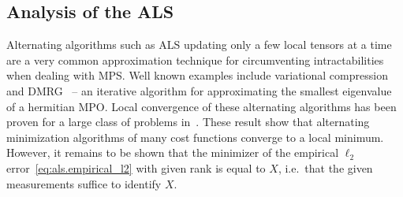 \subsection{Analysis of the ALS}%
\label{sub:als.ana}

Alternating algorithms such as ALS updating only a few local tensors at a time are a very common approximation technique for circumventing intractabilities when dealing with MPS.
Well known examples include variational compression and DMRG~\cite{Schollwoeck_2011_DensityMatrix} --  an iterative algorithm for approximating the smallest eigenvalue of a hermitian MPO.
Local convergence of these alternating algorithms has been proven for a large class of problems in~\cite{Rohwedder_2013_On}.
These result show that alternating minimization algorithms of many cost functions converge to a local minimum.
However, it remains to be shown that the minimizer of the empirical $\ell_2$ error~\eqref{eq:als.empirical_l2} with given rank is equal to $X$, i.e.\ that the given measurements suffice to identify $X$.

